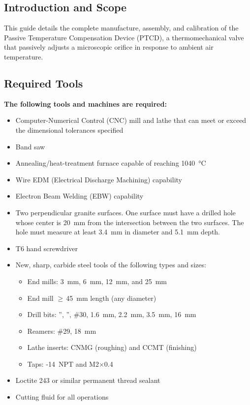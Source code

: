\documentclass[12pt, letterpaper]{report}%
\newcounter{mycounter}           %
\newcounter{sub}[mycounter]      %
\begin{document}
\begin{appendices}
	\section{Introduction and Scope}

	This guide details the complete manufacture, assembly, and calibration of the
	Passive Temperature Compensation Device (PTCD), a thermomechanical valve that
	passively adjusts a microscopic orifice in response to ambient air temperature.


	\subsection{Required Tools}

	\begin{notebox}
		\textbf{The following tools and machines are required:}
		\begin{itemize}[itemsep=2pt]
			\item Computer-Numerical Control (CNC) mill and lathe that can meet or exceed the dimensional
						tolerances specified
			\item Band saw
			\item Annealing/heat-treatment furnace capable of reaching \SI{1040}{\degreeCelsius}
			\item Wire EDM (Electrical Discharge Machining) capability
			\item Electron Beam Welding (EBW) capability
			\item Two perpendicular granite surfaces. One surface must have a drilled hole whose center
						is \SI{20}{\milli\meter} from the intersection between the two surfaces. The
						hole must measure at least \SI{3.4}{\milli\meter} in diameter and \SI{5.1}{\milli\meter}
						depth.
			\item T6 hand screwdriver
		\end{itemize}
	\end{notebox}
	\newpage
	\begin{notebox}
		\begin{itemize}
			\item New, sharp, carbide steel tools of the following types and sizes:
						\begin{itemize}
							\item End mills: 3~mm, 6~mm, 12~mm, and 25~mm
							\item End mill $\geq$\,45~mm length (any diameter)
							\item Drill bits: '', '', \#30, 1.6~mm,
										2.2~mm, 3.5~mm, 16~mm
							\item Reamers: \#29, 18~mm
							\item Lathe inserts: CNMG (roughing) and CCMT (finishing)
							\item Taps: -14~NPT and M2$\times$0.4
						\end{itemize}
			\item Loctite 243 or similar permanent thread sealant
			\item Cutting fluid for all operations
		\end{itemize}
	\end{notebox}


\end{appendices}
\end{document}
